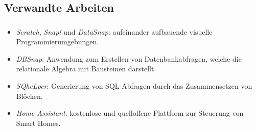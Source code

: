 \subsection{Verwandte Arbeiten}
\begin{frame}
  \frametitle{\currentsectionname}

  \begin{itemize}
    \item \textit{Scratch}, \textit{Snap!} und \textit{DataSnap}: aufeinander aufbauende visuelle Programmierumgebungen.
    \item \textit{DBSnap}: Anwendung zum Erstellen von Datenbankabfragen, welche die relationale Algebra mit Bausteinen darstellt.
    \item \textit{SQheLper}: Generierung von SQL-Abfragen durch das Zusammensetzen von Blöcken.
    \item \textit{Home Assistant}: kostenlose und quelloffene Plattform zur Steuerung von Smart Homes.
  \end{itemize}


\end{frame}

%
%
%

